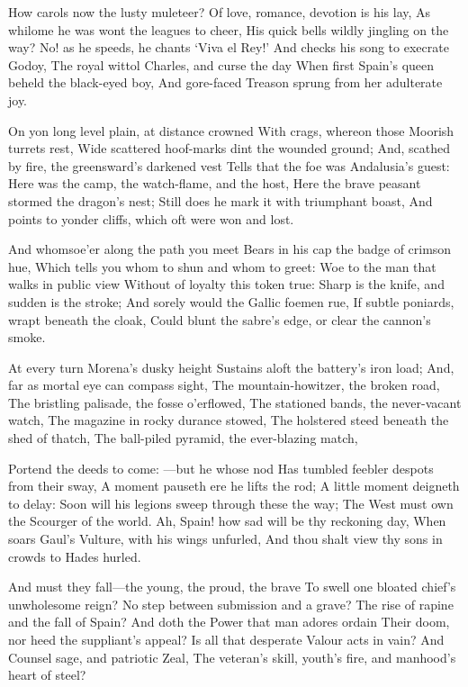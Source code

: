 \documentclass[10pt,twocolumn]{book}
\begin{document}
   How carols now the lusty muleteer?
   Of love, romance, devotion is his lay,
   As whilome he was wont the leagues to cheer,
   His quick bells wildly jingling on the way?
   No! as he speeds, he chants `Viva el Rey!'
   And checks his song to execrate Godoy,
   The royal wittol Charles, and curse the day
   When first Spain's queen beheld the black-eyed boy,
And gore-faced Treason sprung from her adulterate joy.


   On yon long level plain, at distance crowned
   With crags, whereon those Moorish turrets rest,
   Wide scattered hoof-marks dint the wounded ground;
   And, scathed by fire, the greensward's darkened vest
   Tells that the foe was Andalusia's guest:
   Here was the camp, the watch-flame, and the host,
   Here the brave peasant stormed the dragon's nest;
   Still does he mark it with triumphant boast,
And points to yonder cliffs, which oft were won and lost.


   And whomsoe'er along the path you meet
   Bears in his cap the badge of crimson hue,
   Which tells you whom to shun and whom to greet:
   Woe to the man that walks in public view
   Without of loyalty this token true:
   Sharp is the knife, and sudden is the stroke;
   And sorely would the Gallic foemen rue,
   If subtle poniards, wrapt beneath the cloak,
Could blunt the sabre's edge, or clear the cannon's smoke.


   At every turn Morena's dusky height
   Sustains aloft the battery's iron load;
   And, far as mortal eye can compass sight,
   The mountain-howitzer, the broken road,
   The bristling palisade, the fosse o'erflowed,
   The stationed bands, the never-vacant watch,
   The magazine in rocky durance stowed,
   The holstered steed beneath the shed of thatch,
The ball-piled pyramid, the ever-blazing match,


   Portend the deeds to come: ---but he whose nod
   Has tumbled feebler despots from their sway,
   A moment pauseth ere he lifts the rod;
   A little moment deigneth to delay:
   Soon will his legions sweep through these the way;
   The West must own the Scourger of the world.
   Ah, Spain! how sad will be thy reckoning day,
   When soars Gaul's Vulture, with his wings unfurled,
And thou shalt view thy sons in crowds to Hades hurled.


   And must they fall---the young, the proud, the brave\textemdash
   To swell one bloated chief's unwholesome reign?
   No step between submission and a grave?
   The rise of rapine and the fall of Spain?
   And doth the Power that man adores ordain
   Their doom, nor heed the suppliant's appeal?
   Is all that desperate Valour acts in vain?
   And Counsel sage, and patriotic Zeal,
The veteran's skill, youth's fire, and manhood's heart of steel?
\end{document}
